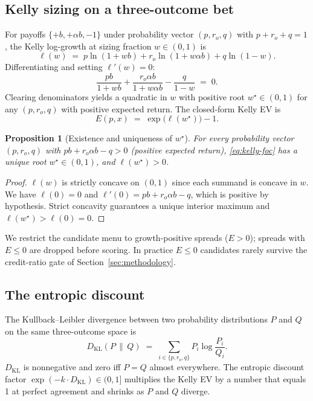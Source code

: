 \documentclass[11pt]{article}
\newcommand{\KL}{D_{\mathrm{KL}}}
\newtheorem{proposition}{Proposition}
\theoremstyle{definition}
\theoremstyle{remark}
\begin{document}
\subsection{Kelly sizing on a three-outcome bet}

For payoffs $\{+b, +\alpha b, -1\}$ under probability vector
$(p, r_o, q)$ with $p + r_o + q = 1$, the Kelly log-growth at sizing
fraction $w \in (0, 1)$ is
\begin{equation}
\ell(w) \;=\; p \ln(1 + wb) + r_o \ln(1 + w \alpha b) + q \ln(1 - w).
\end{equation}
Differentiating and setting $\ell'(w) = 0$:
\begin{equation}
\frac{p b}{1 + wb} + \frac{r_o \alpha b}{1 + w \alpha b} - \frac{q}{1 - w} \;=\; 0.
\label{eq:kelly-foc}
\end{equation}
Clearing denominators yields a quadratic in $w$ with positive root
$w^\star \in (0, 1)$ for any $(p, r_o, q)$ with positive expected
return. The closed-form Kelly EV is
\begin{equation}
E(p, x) \;=\; \exp\bigl(\ell(w^\star)\bigr) - 1.
\label{eq:E}
\end{equation}

\begin{proposition}[Existence and uniqueness of $w^\star$]
\label{prop:wstar}
For every probability vector $(p, r_o, q)$ with $pb + r_o \alpha b - q > 0$
(positive expected return), \eqref{eq:kelly-foc} has a unique root
$w^\star \in (0, 1)$, and $\ell(w^\star) > 0$.
\end{proposition}

\begin{proof}
$\ell(w)$ is strictly concave on $(0, 1)$ since each summand is concave
in $w$. We have $\ell(0) = 0$ and $\ell'(0) = pb + r_o \alpha b - q$, which
is positive by hypothesis. Strict concavity guarantees a unique interior
maximum and $\ell(w^\star) > \ell(0) = 0$.
\end{proof}

We restrict the candidate menu to growth-positive spreads ($E > 0$);
spreads with $E \le 0$ are dropped before scoring. In practice
$E \le 0$ candidates rarely survive the credit-ratio gate of
Section~\ref{sec:methodology}.

\subsection{The entropic discount}

The Kullback--Leibler divergence between two probability distributions
$P$ and $Q$ on the same three-outcome space is
\begin{equation}
\KL(P \,\|\, Q) \;=\; \sum_{i \in \{p, r_o, q\}} P_i \log \frac{P_i}{Q_i}.
\end{equation}
$\KL$ is nonnegative and zero iff $P = Q$ almost everywhere. The
entropic discount factor $\exp(-k \cdot \KL) \in (0, 1]$ multiplies the
Kelly EV by a number that equals 1 at perfect agreement and shrinks
as $P$ and $Q$ diverge.
\end{document}
